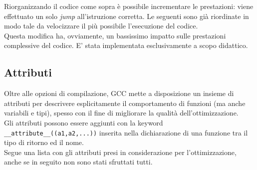 Riorganizzando il codice come sopra è possibile incrementare le prestazioni: 
viene effettuato un solo \emph{jump} all'istruzione corretta. Le seguenti sono 
già riordinate in modo tale da velocizzare il più possibile l'esecuzione del 
codice.\\

Questa modifica ha, ovviamente, un bassissimo impatto sulle prestazioni 
complessive del codice. E' stata implementata esclusivamente a scopo didattico.


\subsection{Attributi}
Oltre alle opzioni di compilazione, GCC mette a disposizione un insieme di   
attributi per descrivere esplicitamente il comportamento di funzioni (ma anche 
variabili e tipi), spesso con il fine di migliorare la qualità 
dell'ottimizzazione.\\
Gli attributi possono essere aggiunti con la keyword 
\verb|__attribute__((a1,a2,...))| inserita nella dichiarazione di una funzione 
tra il tipo di ritorno ed il nome.\\
Segue una lista con gli attributi presi in considerazione 
per l'ottimizzazione, anche se in seguito non sono stati sfruttati tutti.
 
